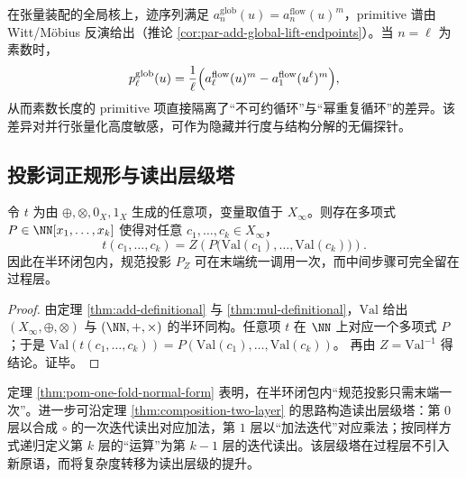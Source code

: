 \begin{remark}[素数长度作为并行结构探针]\label{rem:pom-prime-length-probe}
在张量装配的全局核上，迹序列满足 $a_n^{\mathrm{glob}}(u)=a_n^{\mathrm{flow}}(u)^m$，primitive 谱由 Witt/Möbius 反演给出（推论 \ref{cor:par-add-global-lift-endpoints}）。当 $n=\ell$ 为素数时，
\[
p_\ell^{\mathrm{glob}}(u)=\frac{1}{\ell}\Bigl(a_\ell^{\mathrm{flow}}(u)^m-a_1^{\mathrm{flow}}(u^\ell)^m\Bigr),
\]
从而素数长度的 primitive 项直接隔离了“不可约循环”与“幂重复循环”的差异。该差异对并行张量化高度敏感，可作为隐藏并行度与结构分解的无偏探针。
\end{remark}

\subsection{投影词正规形与读出层级塔}\label{subsec:pom-normal-form}
\begin{theorem}[半环闭包的一次投影正规形]\label{thm:pom-one-fold-normal-form}
令 $t$ 为由 $\oplus,\otimes,0_X,1_X$ 生成的任意项，变量取值于 $X_\infty$。则存在多项式
\(
P\in\NN[x_1,\dots,x_k]
\)
使得对任意 $c_1,\dots,c_k\in X_\infty$，
\[
t(c_1,\dots,c_k)=Z\!\left(P\bigl(\mathrm{Val}(c_1),\dots,\mathrm{Val}(c_k)\bigr)\right).
\]
因此在半环闭包内，规范投影 $P_Z$ 可在末端统一调用一次，而中间步骤可完全留在过程层。
\end{theorem}
\begin{proof}
由定理 \ref{thm:add-definitional} 与 \ref{thm:mul-definitional}，$\mathrm{Val}$ 给出 $(X_\infty,\oplus,\otimes)$ 与 $(\NN,+,\times)$ 的半环同构。任意项 $t$ 在 $\NN$ 上对应一个多项式 $P$；于是
\(
\mathrm{Val}(t(c_1,\dots,c_k))=P(\mathrm{Val}(c_1),\dots,\mathrm{Val}(c_k))
\)。
再由 $Z=\mathrm{Val}^{-1}$ 得结论。证毕。
\end{proof}

\begin{remark}[纲领：读出层级塔]\label{rem:pom-hyper-iteration}
定理 \ref{thm:pom-one-fold-normal-form} 表明，在半环闭包内“规范投影只需末端一次”。进一步可沿定理 \ref{thm:composition-two-layer} 的思路构造读出层级塔：第 $0$ 层以合成 $\circ$ 的一次迭代读出对应加法，第 $1$ 层以“加法迭代”对应乘法；按同样方式递归定义第 $k$ 层的“运算”为第 $k{-}1$ 层的迭代读出。该层级塔在过程层不引入新原语，而将复杂度转移为读出层级的提升。
\end{remark}
